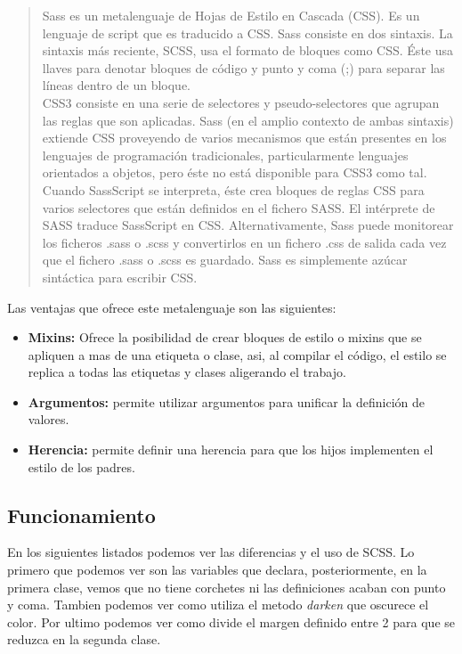 \begin{quote}
	Sass es un metalenguaje de Hojas de Estilo en Cascada (CSS). Es un lenguaje de script que es traducido a CSS. Sass consiste en dos sintaxis. La sintaxis más reciente, SCSS, usa el formato de bloques como CSS. Éste usa llaves para denotar bloques de código y punto y coma (;) para separar las líneas dentro de un bloque.\\
	
	CSS3 consiste en una serie de selectores y pseudo-selectores que agrupan las reglas que son aplicadas. Sass (en el amplio contexto de ambas sintaxis) extiende CSS proveyendo de varios mecanismos que están presentes en los lenguajes de programación tradicionales, particularmente lenguajes orientados a objetos, pero éste no está disponible para CSS3 como tal. Cuando SassScript se interpreta, éste crea bloques de reglas CSS para varios selectores que están definidos en el fichero SASS. El intérprete de SASS traduce SassScript en CSS. Alternativamente, Sass puede monitorear los ficheros .sass o .scss y convertirlos en un fichero .css de salida cada vez que el fichero .sass o .scss es guardado. Sass es simplemente azúcar sintáctica para escribir CSS.
\end{quote}

Las ventajas que ofrece este metalenguaje son las siguientes:

\begin{itemize}
	\item \textbf{Mixins:} Ofrece la posibilidad de crear bloques de estilo o mixins que se apliquen a mas de una etiqueta o clase, asi, al compilar el código, el estilo se replica a todas las etiquetas y clases aligerando el trabajo.
	\item \textbf{Argumentos:} permite utilizar argumentos para unificar la definición de valores.
	\item \textbf{Herencia:} permite definir una herencia para que los hijos implementen el estilo de los padres. 
\end{itemize}

\subsection{Funcionamiento}
En los siguientes listados podemos ver las diferencias y el uso de SCSS. Lo primero que podemos ver son las variables que declara, posteriormente, en la primera clase, vemos que no tiene corchetes ni las definiciones acaban con punto y coma. Tambien podemos ver como utiliza el metodo \textit{darken} que oscurece el color. Por ultimo podemos ver como divide el margen definido entre 2 para que se reduzca en la segunda clase.\\

